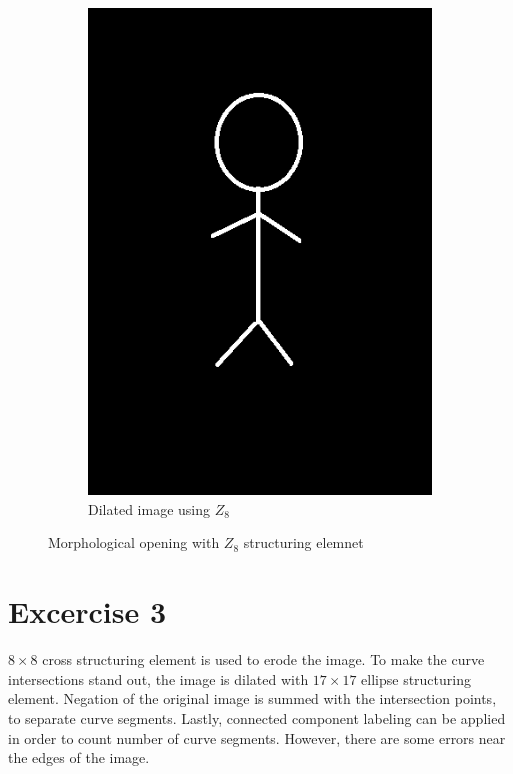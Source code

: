\documentclass[a4paper]{article}
\begin{document}
\begin{figure}[htp]
\begin{subfigure}{.33\textwidth}
  \includegraphics[width=.9\linewidth]{ex2-dilation-z8.png}
  \caption{Dilated image using $Z_8$}
  \label{fig:sub2}
\end{subfigure}
\caption{Morphological opening with $Z_8$ structuring elemnet}
\label{fig:test}
\end{figure}



\newpage
\section*{Excercise 3}
\label{sec:orge0213d8}

\(8\times8\) cross structuring element is used to erode the image. To make the curve intersections stand out, the image is dilated with \(17\times17\) ellipse structuring element. Negation of the original image is summed with the intersection points, to separate curve segments. Lastly, connected component labeling can be applied in order to count number of curve segments. However, there are some errors near the edges of the image.
\end{document}
